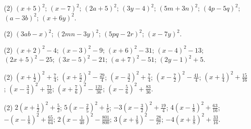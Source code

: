 \documentclass[11pt,a4paper]{scrartcl}
\begin{document}
\newpage
\answerssection

\begin{problem} \phantom{text}
\begin{tasks}[label={(\arabic*)}, label-offset=0.9em](2)
	\task $(x+5)^2$;
	\task $(x-7)^2$;
	\task $(2a+5)^2$;
	\task $(3y-4)^2$;
	\task $(5m+3n)^2$;
	\task $(4p-5q)^2$;
	\task $(a-3b)^2$;
	\task $(x+6y)^2$.
\end{tasks}
\end{problem}

\begin{problem} \phantom{text}
\begin{tasks}[label={(\arabic*)}, label-offset=0.9em](2)
	\task $(3ab-x)^2$;
	\task $(2mn-3y)^2$;
	\task $(5pq-2r)^2$;
	\task $(x-7y)^2$.
\end{tasks}
\end{problem}

\begin{problem} \phantom{text}
\begin{tasks}[label={(\arabic*)}, label-offset=0.9em](2)
	\task $(x+2)^2-4$;
	\task $(x-3)^2-9$;
	\task $(x+6)^2-31$;
	\task $(x-4)^2-13$;
	\task $(2x+5)^2-25$;
	\task $(3x-5)^2-21$;
	\task $(a+7)^2-51$;
	\task $(2y-1)^2+5$.
\end{tasks}
\end{problem}

\begin{problem} \phantom{text}
\begin{tasks}[label={(\arabic*)}, label-offset=0.9em](2)
	\task $\left(x+\frac{1}{2}\right)^2+\frac{7}{4}$;
	\task $\left(x+\frac{5}{2}\right)^2-\frac{29}{4}$;
	\task $\left(x-\frac{3}{2}\right)^2+\frac{7}{4}$;
	\task $\left(x-\frac{7}{2}\right)^2-\frac{41}{4}$;
	\task $\left(x+\frac{1}{4}\right)^2+\frac{15}{16}$;
	\task $\left(x-\frac{3}{4}\right)^2+\frac{71}{16}$;
	\task $\left(x+\frac{7}{6}\right)^2-\frac{121}{36}$;
	\task $\left(x-\frac{5}{6}\right)^2+\frac{83}{36}$.
\end{tasks}
\end{problem}

\begin{problem} \phantom{text}

\begin{tasks}[label={(\arabic*)}, label-offset=0.9em](2)
	\task $2\left(x+\frac{1}{2}\right)^2+\frac{5}{2}$;
	\task $5\left(x-\frac{2}{5}\right)^2+\frac{1}{5}$;
	\task $-3\left(x-\frac{3}{2}\right)^2+\frac{19}{4}$;
	\task $4\left(x-\frac{1}{8}\right)^2+\frac{63}{16}$;
	\task $-\left(x-\frac{1}{8}\right)^2+\frac{65}{64}$;
	\task $2\left(x-\frac{1}{40}\right)^2-\frac{801}{800}$;
	\task $3\left(x+\frac{1}{9}\right)^2-\frac{28}{27}$;
	\task $-4\left(x+\frac{1}{8}\right)^2+\frac{33}{16}$.
\end{tasks}
\end{problem}
\end{document}
